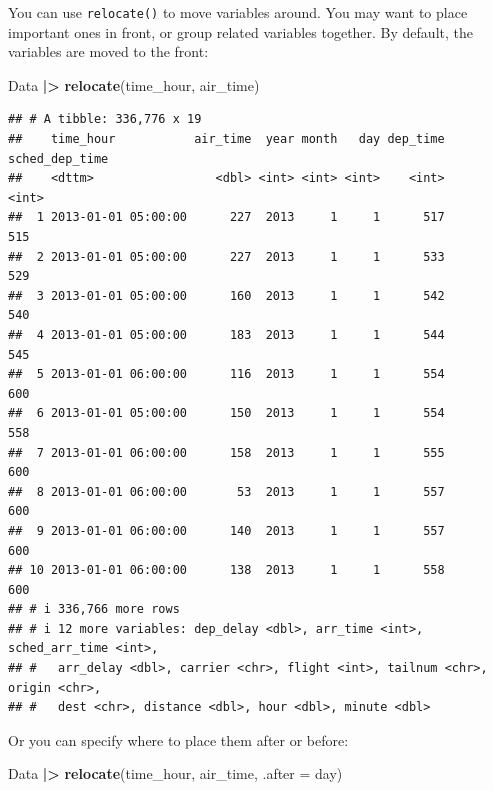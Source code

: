 \documentclass[
]{book}
\newenvironment{Shaded}{\begin{snugshade}}{\end{snugshade}}
\newcommand{\AttributeTok}[1]{\textcolor[rgb]{0.13,0.29,0.53}{#1}}
\newcommand{\FunctionTok}[1]{\textcolor[rgb]{0.13,0.29,0.53}{\textbf{#1}}}
\newcommand{\NormalTok}[1]{#1}
\newcommand{\SpecialCharTok}[1]{\textcolor[rgb]{0.81,0.36,0.00}{\textbf{#1}}}
\theoremstyle{definition}
\theoremstyle{definition}
\theoremstyle{definition}
\theoremstyle{definition}
\theoremstyle{remark}
\begin{document}
You can use \texttt{relocate()} to move variables around. You may want to place important ones in front, or group related variables together. By default, the variables are moved to the front:

\begin{Shaded}
\begin{Highlighting}[]
\NormalTok{Data }\SpecialCharTok{|\textgreater{}} 
  \FunctionTok{relocate}\NormalTok{(time\_hour, air\_time)}
\end{Highlighting}
\end{Shaded}

\begin{verbatim}
## # A tibble: 336,776 x 19
##    time_hour           air_time  year month   day dep_time sched_dep_time
##    <dttm>                 <dbl> <int> <int> <int>    <int>          <int>
##  1 2013-01-01 05:00:00      227  2013     1     1      517            515
##  2 2013-01-01 05:00:00      227  2013     1     1      533            529
##  3 2013-01-01 05:00:00      160  2013     1     1      542            540
##  4 2013-01-01 05:00:00      183  2013     1     1      544            545
##  5 2013-01-01 06:00:00      116  2013     1     1      554            600
##  6 2013-01-01 05:00:00      150  2013     1     1      554            558
##  7 2013-01-01 06:00:00      158  2013     1     1      555            600
##  8 2013-01-01 06:00:00       53  2013     1     1      557            600
##  9 2013-01-01 06:00:00      140  2013     1     1      557            600
## 10 2013-01-01 06:00:00      138  2013     1     1      558            600
## # i 336,766 more rows
## # i 12 more variables: dep_delay <dbl>, arr_time <int>, sched_arr_time <int>,
## #   arr_delay <dbl>, carrier <chr>, flight <int>, tailnum <chr>, origin <chr>,
## #   dest <chr>, distance <dbl>, hour <dbl>, minute <dbl>
\end{verbatim}

Or you can specify where to place them after or before:

\begin{Shaded}
\begin{Highlighting}[]
\NormalTok{Data }\SpecialCharTok{|\textgreater{}} 
  \FunctionTok{relocate}\NormalTok{(time\_hour, air\_time, }\AttributeTok{.after =}\NormalTok{ day)}
\end{Highlighting}
\end{Shaded}
\end{document}
